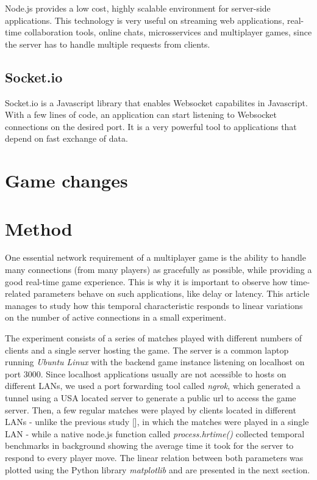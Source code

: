 \documentclass[english]{sbrt}
\begin{document}
Node.js provides a low cost, highly scalable environment for server-side applications. This technology is very useful on streaming web applications, real-time collaboration tools, online chats, microsservices and multiplayer games, since the server has to handle multiple requests from clients.

\subsection{\textbf{Socket.io}}
Socket.io is a Javascript library that enables Websocket capabilites in Javascript. With a few lines of code, an application can start listening to Websocket connections on the desired port. It is a very powerful tool to applications that depend on fast exchange of data.

\section{\textbf{Game changes}}

\section{\textbf{Method}}

One essential network requirement of a multiplayer game is the ability to handle many connections (from many players) as gracefully as possible, while providing a good real-time game experience. This is why it is important to observe how time-related parameters behave on such applications, like delay or latency. This article manages to study how this temporal characteristic responds to linear variations on the number of active connections in a small experiment.

The experiment consists of a series of matches played with different numbers of clients and a single server hosting the game.
The server is a common laptop running \textit{Ubuntu Linux} with the backend game instance listening on localhost on port 3000. Since localhost applications usually are not acessible to hosts on different LANs, we used a port forwarding tool called \textit{ngrok}, which generated a tunnel using a USA located server to generate a public url to access the game server. Then, a few regular matches were played by clients located in different LANs - unlike the previous study [], in which the matches were played in a single LAN - while a native node.js function called \textit{process.hrtime()} collected temporal benchmarks in background showing the average time it took for the server to respond to every player move. The linear relation between both parameters was plotted using the Python library \textit{matplotlib} and are presented in the next section.
\end{document}
